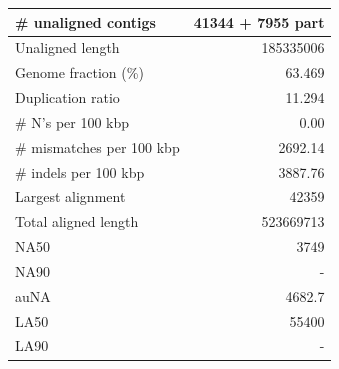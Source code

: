 \documentclass[12pt,a4paper]{article}
\begin{document}
\begin{table}[ht]
\begin{center}
\begin{tabular}{|l*{1}{|r}|}
\# unaligned contigs & 41344 + 7955 part \\ \hline
Unaligned length & 185335006 \\ \hline
Genome fraction (\%) & 63.469 \\ \hline
Duplication ratio & 11.294 \\ \hline
\# N's per 100 kbp & 0.00 \\ \hline
\# mismatches per 100 kbp & 2692.14 \\ \hline
\# indels per 100 kbp & 3887.76 \\ \hline
Largest alignment & 42359 \\ \hline
Total aligned length & 523669713 \\ \hline
NA50 & 3749 \\ \hline
NA90 & - \\ \hline
auNA & 4682.7 \\ \hline
LA50 & 55400 \\ \hline
LA90 & - \\ \hline
\end{tabular}
\end{center}
\end{table}
\end{document}
